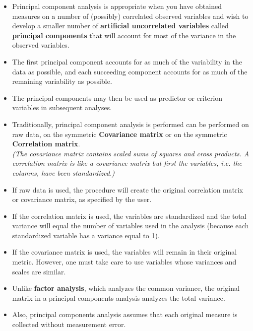 \documentclass[]{article}
\begin{document}
\begin{itemize}
\item Principal component analysis is appropriate when you have obtained measures on a number of
(possibly) correlated observed variables and wish to develop a smaller number of \textbf{artificial uncorrelated variables} called \textbf{principal components} that will account for most of the variance in the observed variables. 

\item The first principal component accounts for as much of the variability in the data as possible, and each succeeding component accounts for as much of the remaining variability as possible. \item The principal
components may then be used as predictor or criterion variables in subsequent analyses.


\item Traditionally, principal component analysis is performed can be performed on raw data, on the symmetric \textbf{Covariance matrix} or on the symmetric \textbf{Correlation matrix}.\\\textit{ (The covariance matrix contains scaled sums of squares and cross products. A correlation matrix is like a covariance matrix but first the variables, i.e. the columns, have been standardized.)
}
\item If raw data is used, the procedure will create the original correlation matrix or covariance matrix, as specified by the user.  
\item If the correlation matrix is used, the variables are standardized and the total variance will equal the number of variables used in the analysis (because each standardized variable has a variance equal to 1).  

\item If the covariance matrix is used, the variables will remain in their original metric.  However, one must take care to use variables whose variances and scales are similar.  

\item Unlike \textbf{factor analysis}, which analyzes the common variance, the original matrix in a principal components analysis analyzes the total variance. 
\item Also, principal components analysis assumes that each original measure is collected without measurement error.
\end{itemize}
\newpage


\end{document}
